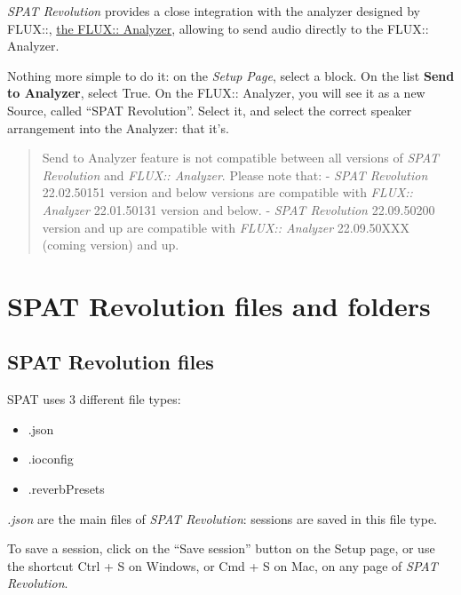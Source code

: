 \documentclass[
  letterpaper,
  DIV=11,
  numbers=noendperiod]{scrreport}
\providecommand{\tightlist}{%
  \setlength{\itemsep}{0pt}\setlength{\parskip}{0pt}}\usepackage{longtable,booktabs,array}
\begin{document}
\emph{SPAT Revolution} provides a close integration with the analyzer
designed by FLUX::,
\href{https://www.flux.audio/project/flux-analyzer/}{the FLUX::
Analyzer}, allowing to send audio directly to the FLUX:: Analyzer.

Nothing more simple to do it: on the \emph{Setup Page}, select a block.
On the list \textbf{Send to Analyzer}, select True. On the FLUX::
Analyzer, you will see it as a new Source, called ``SPAT Revolution''.
Select it, and select the correct speaker arrangement into the Analyzer:
that it's.

\begin{quote}
Send to Analyzer feature is not compatible between all versions of
\emph{SPAT Revolution} and \emph{FLUX:: Analyzer}. Please note that: -
\emph{SPAT Revolution} 22.02.50151 version and below versions are
compatible with \emph{FLUX:: Analyzer} 22.01.50131 version and below. -
\emph{SPAT Revolution} 22.09.50200 version and up are compatible with
\emph{FLUX:: Analyzer} 22.09.50XXX (coming version) and up.
\end{quote}


\hypertarget{spat-revolution-files-and-folders}{%
\chapter{SPAT Revolution files and
folders}\label{spat-revolution-files-and-folders}}

\hypertarget{spat-revolution-files}{%
\section{SPAT Revolution files}\label{spat-revolution-files}}

SPAT uses 3 different file types:

\begin{itemize}
\tightlist
\item
  .json
\item
  .ioconfig
\item
  .reverbPresets
\end{itemize}

\emph{.json} are the main files of \emph{SPAT Revolution}: sessions are
saved in this file type.

To save a session, click on the ``Save session'' button on the Setup
page, or use the shortcut Ctrl + S on Windows, or Cmd + S on Mac, on any
page of \emph{SPAT Revolution}.
\end{document}
